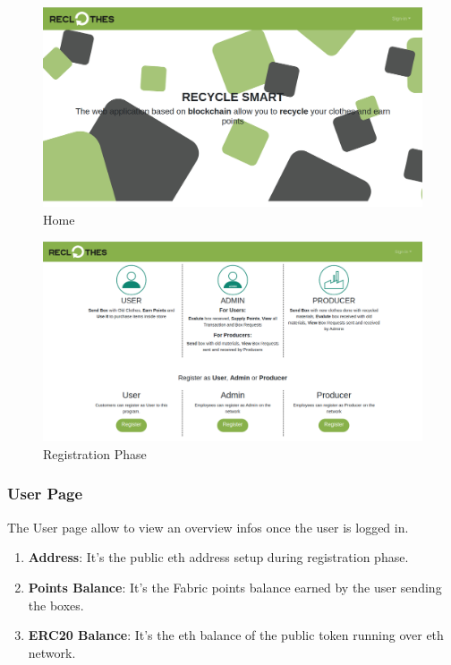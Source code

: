 \begin{figure}[h!]
    \centering
    \includegraphics[totalheight=7.5cm]{img/dapp/home1.png}
    \caption{Home}
    \label{fig:home}
\end{figure}

\begin{figure}[h!]
    \centering
    \includegraphics[totalheight=7.5cm]{img/dapp/home2.png}
    \caption{Registration Phase}
    \label{fig:registration}
\end{figure}

\newpage
\subsubsection{User Page}

The User page allow to view an overview infos once the user is logged in. 

\begin{enumerate}[-]
    \item \textbf{Address}: It's the public eth address setup during registration phase. 
    \item \textbf{Points Balance}: It's the Fabric points balance earned by the user sending the boxes.
    \item \textbf{ERC20 Balance}: It's the eth balance of the public token running over eth network.
\end{enumerate}

